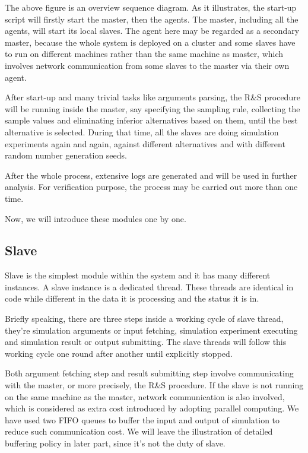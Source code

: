The above figure is an overview sequence diagram. As it illustrates, the start-up script will firstly start the master, then the agents. The master, including all the agents, will start its local slaves. The agent here may be regarded as a secondary master, because the whole system is deployed on a cluster and some slaves have to run on different machines rather than the same machine as master, which involves network communication from some slaves to the master via their own agent.

After start-up and many trivial tasks like arguments parsing, the R\&S procedure will be running inside the master, say specifying the sampling rule, collecting the sample values and eliminating inferior alternatives based on them, until the best alternative is selected. During that time, all the slaves are doing simulation experiments again and again, against different alternatives and with different random number generation seeds.

After the whole process, extensive logs are generated and will be used in further analysis. For verification purpose, the process may be carried out more than one time.

Now, we will introduce these modules one by one.

\subsection{Slave}

Slave is the simplest module within the system and it has many different instances. A slave instance is a dedicated thread. These threads are identical in code while different in the data it is processing and the status it is in.

Briefly speaking, there are three steps inside a working cycle of slave thread, they're simulation arguments or input fetching, simulation experiment executing and simulation result or output submitting. The slave threads will follow this working cycle one round after another until explicitly stopped.

Both argument fetching step and result submitting step involve communicating with the master, or more precisely, the R\&S procedure. If the slave is not running on the same machine as the master, network communication is also involved, which is considered as extra cost introduced by adopting parallel computing. We have used two FIFO queues to buffer the input and output of simulation to reduce such communication cost. We will leave the illustration of detailed buffering policy in later part, since it's not the duty of slave.

